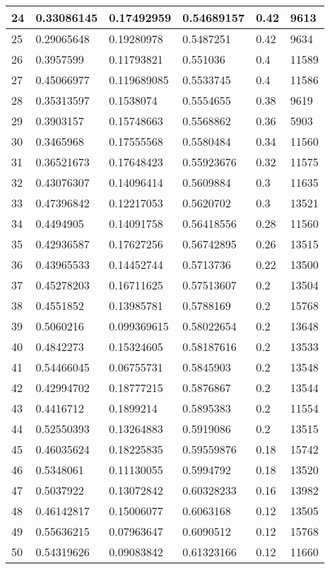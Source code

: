 \begin{longtable}{|l|l|l|l|l|l|}
24 & 0.33086145 & 0.17492959 & 0.54689157 & 0.42 & 9613 \\ \hline 
25 & 0.29065648 & 0.19280978 & 0.5487251 & 0.42 & 9634 \\ \hline 
26 & 0.3957599 & 0.11793821 & 0.551036 & 0.4 & 11589 \\ \hline 
27 & 0.45066977 & 0.119689085 & 0.5533745 & 0.4 & 11586 \\ \hline 
28 & 0.35313597 & 0.1538074 & 0.5554655 & 0.38 & 9619 \\ \hline 
29 & 0.3903157 & 0.15748663 & 0.5568862 & 0.36 & 5903 \\ \hline 
30 & 0.3465968 & 0.17555568 & 0.5580484 & 0.34 & 11560 \\ \hline 
31 & 0.36521673 & 0.17648423 & 0.55923676 & 0.32 & 11575 \\ \hline 
32 & 0.43076307 & 0.14096414 & 0.5609884 & 0.3 & 11635 \\ \hline 
33 & 0.47396842 & 0.12217053 & 0.5620702 & 0.3 & 13521 \\ \hline 
34 & 0.4494905 & 0.14091758 & 0.56418556 & 0.28 & 11560 \\ \hline 
35 & 0.42936587 & 0.17627256 & 0.56742895 & 0.26 & 13515 \\ \hline 
36 & 0.43965533 & 0.14452744 & 0.5713736 & 0.22 & 13500 \\ \hline 
37 & 0.45278203 & 0.16711625 & 0.57513607 & 0.2 & 13504 \\ \hline 
38 & 0.4551852 & 0.13985781 & 0.5788169 & 0.2 & 15768 \\ \hline 
39 & 0.5060216 & 0.099369615 & 0.58022654 & 0.2 & 13648 \\ \hline 
40 & 0.4842273 & 0.15324605 & 0.58187616 & 0.2 & 13533 \\ \hline 
41 & 0.54466045 & 0.06755731 & 0.5845903 & 0.2 & 13548 \\ \hline 
42 & 0.42994702 & 0.18777215 & 0.5876867 & 0.2 & 13544 \\ \hline 
43 & 0.4416712 & 0.1899214 & 0.5895383 & 0.2 & 11554 \\ \hline 
44 & 0.52550393 & 0.13264883 & 0.5919086 & 0.2 & 13515 \\ \hline 
45 & 0.46035624 & 0.18225835 & 0.59559876 & 0.18 & 15742 \\ \hline 
46 & 0.5348061 & 0.11130055 & 0.5994792 & 0.18 & 13520 \\ \hline 
47 & 0.5037922 & 0.13072842 & 0.60328233 & 0.16 & 13982 \\ \hline 
48 & 0.46142817 & 0.15006077 & 0.6063168 & 0.12 & 13505 \\ \hline 
49 & 0.55636215 & 0.07963647 & 0.6090512 & 0.12 & 15768 \\ \hline 
50 & 0.54319626 & 0.09083842 & 0.61323166 & 0.12 & 11660 \\ \hline 
\end{longtable}